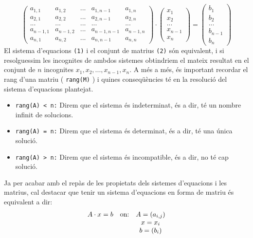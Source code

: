 \documentclass{article}
\begin{document}
    \begin{equation}
        \begin{pmatrix}
            a_{1,1} & a_{1,2} & ... & a_{1,n-1} & a_{1,n}\\ 
            a_{2,1} & a_{2,2} & ... & a_{2,n-1} & a_{2,n}\\ 
            ... & ... & ...  & ... & ... \\ 
            a_{n-1,1} & a_{n-1,2} & ... & a_{n-1,n-1} & a_{n-1,n}\\ 
            a_{n,1} & a_{n,2} & ... & a_{n,n-1} & a_{n,n} 
        \end{pmatrix} \cdot 
        \begin{pmatrix}
            x_1 \\ x_2\\ ...\\ x_{n-1}\\ x_{n}
        \end{pmatrix} =
        \begin{pmatrix}
            b_1\\ b_2\\ ...\\ b_{n-1}\\ b_n
        \end{pmatrix}
    \end{equation}
    El sistema d'equacions \texttt{(1)} i el conjunt de matrius \texttt{(2)} són equivalent, i si resolguessim les incognites de ambdos sistemes obtindriem el mateix resultat en el conjunt de $n$ incognites $x_1, x_2, ..., x_{n-1}, x_{n}$. A més a més, és important recordar el rang d'una matriu ( \texttt{rang(M)} ) i quines conseqüències té en la resolució del sistema d'equacions plantejat. 
    \begin{itemize}
        \item \texttt{rang(A) < n:} Direm que el sistema és indeterminat, és a dir, té un nombre infinit de solucions.
        \item \texttt{rang(A) = n:} Direm que el sistema és determinat, és a dir, té una única solució.
        \item \texttt{rang(A) > n:} Direm que el sistema és incompatible, és a dir, no té cap solució.
    \end{itemize}
    Ja per acabar amb el repàs de les propietats dels sistemes d'equacions i les matrius, cal destacar que tenir un sistema d'equacions en forma de matriu és equivalent a dir:
    \begin{equation}
    \begin{matrix}
        A \cdot x = b  & \textup{on:} & A = (a_{i,j})\\ 
        & & x = x_i \\
        & & b = ( b_i )
    \end{matrix}
    \end{equation}
\end{document}
